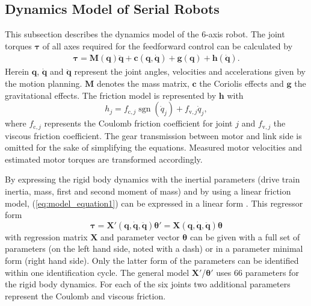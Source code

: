 
\subsection{Dynamics Model of Serial Robots}
This subsection describes the dynamics model of the 6-axis robot.
The joint torques $\boldsymbol{\tau}$ of all axes required for the feedforward control can be calculated by
%
\begin{equation}
\label{eq:model_equation1}
\begin{split}
\boldsymbol{\tau}=
\boldsymbol{M}(\boldsymbol{q}) \ddot{\boldsymbol{q}}+\boldsymbol{c}(\boldsymbol{q}, \dot{\boldsymbol{q}})+\boldsymbol{g}(\boldsymbol{q})+\boldsymbol{h}(\dot{\boldsymbol{q}}).
\end{split}
\end{equation}
%
Herein $\boldsymbol{q}$, $\dot{\boldsymbol{q}}$ and $\ddot{\boldsymbol{q}}$ represent the joint angles, velocities and accelerations given by the motion planning. $\boldsymbol{M}$ denotes the mass matrix, $\boldsymbol{c}$ the Coriolis effects and $\boldsymbol{g}$ the gravitational effects.
The friction model is represented by $\boldsymbol{h}$ with
%
\begin{equation}
h_{j}=f_{\mathrm{c}, j} \operatorname{sgn}\left(\dot{{q}}_{j}\right)+f_{\mathrm{v}, j} \dot{q}_{j},
\end{equation}
%
where $f_{\mathrm{c}, j}$ represents the Coulomb friction coefficient for joint $j$ and $f_{\mathrm{v}, j}$ the viscous friction coefficient.
The gear transmission between motor and link side is omitted for the sake of simplifying the equations. Measured motor velocities and estimated motor torques are transformed accordingly.

By expressing the rigid body dynamics with the inertial parameters (drive train inertia, mass, first and second moment of mass) and by using a linear friction model, (\ref{eq:model_equation1}) can be expressed in a linear form \cite{Khalil.2006}.
%
This regressor form
%
\begin{equation}
\boldsymbol{\tau}
=
\boldsymbol{X}'(\boldsymbol{q}, \dot{\boldsymbol{q}},\ddot{\boldsymbol{q}}) \boldsymbol{\theta}'
=
\boldsymbol{X}(\boldsymbol{q}, \dot{\boldsymbol{q}},\ddot{\boldsymbol{q}}) \boldsymbol{\theta}
\label{eq:model_regressor}
\end{equation}
%
with regression matrix $\boldsymbol{X}$ and parameter vector $\boldsymbol{\theta}$
can be given with a full set of parameters (on the left hand side, noted with a dash) or in a parameter minimal form (right hand side).
Only the latter form of the parameters can be identified within one identification cycle.
The general model $\boldsymbol{X}'$/$\boldsymbol{\theta}'$ uses 66 parameters for the rigid body dynamics.
For each of the six joints two additional parameters represent the Coulomb and viscous friction.

